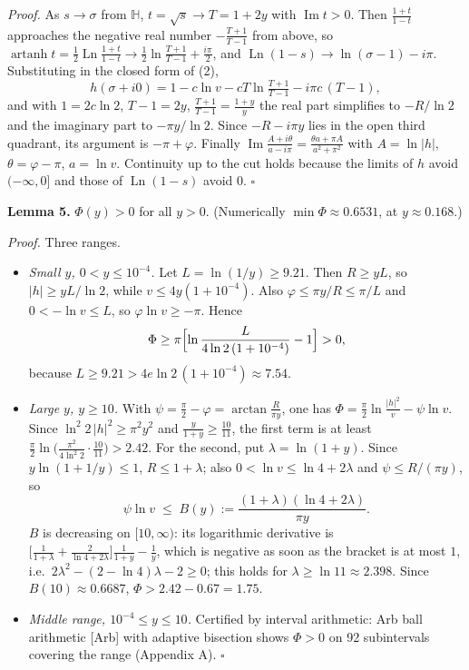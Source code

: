 \documentclass[
  11pt,
]{article}
\providecommand{\tightlist}{%
  \setlength{\itemsep}{0pt}\setlength{\parskip}{0pt}}
\begin{document}
\emph{Proof.} As \(s \to \sigma\) from \(\mathbb{H}\),
\(t = \sqrt s \to T = 1 + 2y\) with \(\operatorname{Im} t > 0\). Then
\(\frac{1+t}{1-t}\) approaches the negative real number
\(-\frac{T+1}{T-1}\) from above, so
\(\operatorname{artanh} t = \tfrac12\operatorname{Ln}\frac{1+t}{1-t} \to \tfrac12 \ln\frac{T+1}{T-1} + \tfrac{i\pi}{2}\),
and \(\operatorname{Ln}(1-s) \to \ln(\sigma - 1) - i\pi\). Substituting
in the closed form of (2), \[
h(\sigma+i0) = 1 - c\ln v - cT\ln\tfrac{T+1}{T-1} - i\pi c\,(T-1),
\] and with \(1 = 2c\ln 2\), \(T - 1 = 2y\),
\(\frac{T+1}{T-1} = \frac{1+y}{y}\) the real part simplifies to
\(-R/\ln 2\) and the imaginary part to \(-\pi y/\ln 2\). Since
\(-R - i\pi y\) lies in the open third quadrant, its argument is
\(-\pi + \varphi\). Finally
\(\operatorname{Im}\frac{A + i\theta}{a - i\pi} = \frac{\theta a + \pi A}{a^2 + \pi^2}\)
with \(A = \ln|h|\), \(\theta = \varphi - \pi\), \(a = \ln v\).
Continuity up to the cut holds because the limits of \(h\) avoid
\((-\infty, 0]\) and those of \(\operatorname{Ln}(1-s)\) avoid \(0\).
\(\square\)

\textbf{Lemma 5.} \(\Phi(y) > 0\) for all \(y > 0\). (Numerically
\(\min \Phi \approx 0.6531\), at \(y \approx 0.168\).)

\emph{Proof.} Three ranges.

\begin{itemize}
\tightlist
\item
  \emph{Small \(y\), \(0 < y \le 10^{-4}\).} Let
  \(L = \ln(1/y) \ge 9.21\). Then \(R \ge yL\), so \(|h| \ge yL/\ln 2\),
  while \(v \le 4y(1 + 10^{-4})\). Also
  \(\varphi \le \pi y/R \le \pi/L\) and \(0 < -\ln v \le L\), so
  \(\varphi \ln v \ge -\pi\). Hence \[
  \Phi \ge \pi\Bigl[\ln \frac{L}{4\ln 2\,(1+10^{-4})} - 1\Bigr] > 0,
  \] because \(L \ge 9.21 > 4e\ln 2\,(1+10^{-4}) \approx 7.54\).
\item
  \emph{Large \(y\), \(y \ge 10\).} With
  \(\psi = \frac\pi2 - \varphi = \arctan\frac{R}{\pi y}\), one has
  \(\Phi = \frac\pi2 \ln\frac{|h|^2}{v} - \psi \ln v\). Since
  \(\ln^2 2\,|h|^2 \ge \pi^2y^2\) and
  \(\frac{y}{1+y} \ge \frac{10}{11}\), the first term is at least
  \(\frac\pi2\ln\bigl(\frac{\pi^2}{4\ln^2 2}\cdot\frac{10}{11}\bigr) > 2.42\).
  For the second, put \(\lambda = \ln(1+y)\). Since
  \(y\ln(1+1/y) \le 1\), \(R \le 1 + \lambda\); also
  \(0 < \ln v \le \ln 4 + 2\lambda\) and \(\psi \le R/(\pi y)\), so \[
  \psi \ln v \;\le\; B(y) := \frac{(1+\lambda)(\ln 4 + 2\lambda)}{\pi y} .
  \] \(B\) is decreasing on \([10,\infty)\): its logarithmic derivative
  is
  \(\bigl[\frac{1}{1+\lambda} + \frac{2}{\ln 4 + 2\lambda}\bigr]\frac{1}{1+y} - \frac1y\),
  which is negative as soon as the bracket is at most \(1\),
  i.e.~\(2\lambda^2 - (2 - \ln 4)\lambda - 2 \ge 0\); this holds for
  \(\lambda \ge \ln 11 \approx 2.398\). Since \(B(10) \approx 0.6687\),
  \(\Phi > 2.42 - 0.67 = 1.75\).
\item
  \emph{Middle range, \(10^{-4} \le y \le 10\).} Certified by interval
  arithmetic: Arb ball arithmetic {[}Arb{]} with adaptive bisection
  shows \(\Phi > 0\) on 92 subintervals covering the range (Appendix A).
  \(\square\)
\end{itemize}
\end{document}
